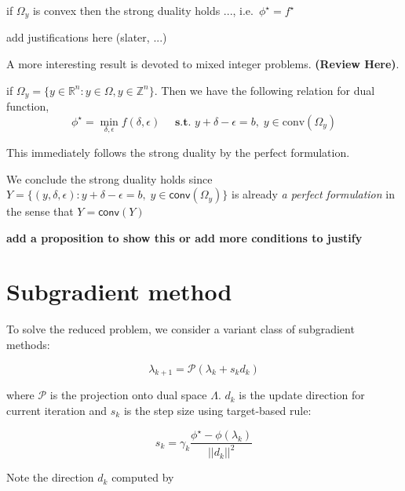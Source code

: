 \begin{theorem}
  if \(\Omega_y\) is convex then the strong duality holds ...,
  i.e.~\(\phi^\star = f^\star\)
\end{theorem}

add justifications here (slater, ...)

A more interesting result is devoted to mixed integer problems.
\textbf{(Review Here)}.

\begin{lemma}
  if \(\Omega_y = \{y \in \mathbb R^n: y \in \Omega, y\in \mathbb Z^n\}\).
  Then we have the following relation for dual function,
  \[ \phi^\star = \min_{\delta, \epsilon} f(\delta, \epsilon)\quad \textbf{ s.t. }  y + \delta - \epsilon = b,\; y \in \textrm{conv}(\Omega_y)\]
\end{lemma}

This immediately follows the strong duality by the perfect formulation.

\begin{theorem}\label{strong-ip}
  We conclude the strong duality holds since
  \(Y = \{(y, \delta, \epsilon): y + \delta - \epsilon = b,\; y \in \textsf{conv}(\Omega_y)\}\)
  is already \emph{a perfect formulation} in the sense that
  \(Y = \textsf{conv}(Y)\)
\end{theorem}

\textbf{add a proposition to show this or add more conditions to
  justify}


\hypertarget{subgradient-method}{%
  \section{Subgradient method}\label{subgradient-method}}

To solve the reduced problem, we consider a variant class of subgradient
methods:

\begin{equation}\lambda_{k+1} = \mathcal{P}(\lambda_{k} + s_{k}d_{k})\end{equation}

where \(\mathcal P\) is the projection onto dual space \(\Lambda\).
\(d_k\) is the update direction for current iteration and \(s_{k}\) is
the step size using target-based rule:

\begin{equation}\label{eq:step_size}
  s_{k} = \gamma_k\frac{\phi^\star - \phi(\lambda_k)}{||d_{k}||^2}
\end{equation}

Note the direction \(d_k\) computed by

